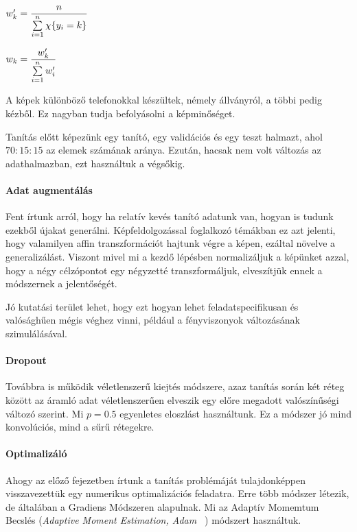 $ w_k' =  \dfrac{n}{ \sum\limits_{{i}=1}^{n} \chi\{y_i = k\}}  $

$ w_k =  \dfrac{w_k'}{\sum\limits_{{i}=1}^{n} w_i'} $


A képek különböző telefonokkal készültek, némely állványról, a többi pedig kézből.
Ez nagyban tudja befolyásolni a képminőséget.


Tanítás előtt képezünk egy tanító, egy validációs és egy teszt halmazt, ahol 
$ 70:15:15 $ az elemek számának aránya. Ezután, hacsak nem volt változás az adathalmazban,
ezt használtuk a végsőkig.



\paragraph{Adat augmentálás}

Fent írtunk arról, hogy ha relatív kevés tanító adatunk van, hogyan is tudunk
ezekből újakat generálni. Képfeldolgozással foglalkozó témákban ez azt jelenti,
hogy valamilyen affin transzformációt hajtunk végre a képen, ezáltal növelve a 
generalizálást. Viszont mivel mi a kezdő lépésben normalizáljuk a képünket azzal,
hogy a négy célzópontot egy négyzetté transzformáljuk, elveszítjük ennek a módszernek
a jelentőségét.


Jó kutatási terület lehet, hogy ezt hogyan lehet feladatspecifikusan és valósághűen 
mégis véghez vinni, például a fényviszonyok változásának szimulálásával.

\paragraph{Dropout} Továbbra is működik véletlenszerű kiejtés módszere,
azaz tanítás során két réteg között az áramló adat véletlenszerűen elveszik
egy előre megadott valószínűségi változó szerint. Mi $ p=0.5 $ egyenletes 
eloszlást használtunk. Ez a módszer jó mind konvolúciós, mind a sűrű rétegekre.



\paragraph{Optimalizáló}

Ahogy az előző fejezetben írtunk a tanítás problémáját tulajdonképpen visszavezettük
egy numerikus optimalizációs feladatra. Erre több módszer létezik, de általában a 
Gradiens Módszeren alapulnak. Mi az Adaptív Momemtum Becslés 
(\textit{Adaptive Moment Estimation, Adam~\cite{adam} }) módszert használtuk.

